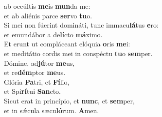 \oddverse  ab occúltis \textbf{me}is \textbf{mun}da me:~\*\\
\oddverse et ab aliénis parce \textbf{ser}vo \textbf{tu}o.\\
\evenverse Si mei non fúerint domináti, tunc immacu\textbf{lá}tus \textbf{e}ro:~\*\\
\evenverse et emundábor a de\textbf{lí}cto \textbf{má}ximo.\\
\oddverse Et erunt ut compláceant elóquia \textbf{o}ris \textbf{me}i:~\*\\
\oddverse et meditátio cordis mei in conspéctu \textbf{tu}o \textbf{sem}per.\\
\evenverse Dómine, ad\textbf{jú}tor \textbf{me}us,~\*\\
\evenverse et re\textbf{dém}ptor \textbf{me}us.\\
\oddverse Glória \textbf{Pa}tri, et \textbf{Fí}lio,~\*\\
\oddverse et Spi\textbf{rí}tui \textbf{San}cto.\\
\evenverse Sicut erat in princípio, et \textbf{nunc}, et \textbf{sem}per,~\*\\
\evenverse et in sǽcula sæcu\textbf{ló}rum. \textbf{A}men.\\
